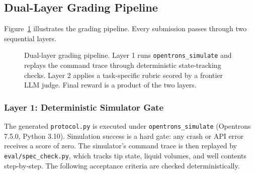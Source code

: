 \documentclass[11pt,a4paper]{article}
\begin{document}
\subsection{Dual-Layer Grading Pipeline}
\label{sec:grader}

Figure~\ref{fig:pipeline} illustrates the grading pipeline.
Every submission passes through two sequential layers.

\begin{figure}[H]
\centering
{}
\caption{Dual-layer grading pipeline. Layer 1 runs \texttt{opentrons\_simulate}
and replays the command trace through deterministic state-tracking checks.
Layer 2 applies a task-specific rubric scored by a frontier LLM judge.
Final reward is a product of the two layers.}
\label{fig:pipeline}
\end{figure}

\subsubsection{Layer 1: Deterministic Simulator Gate}
\label{sec:layer1}

The generated \texttt{protocol.py} is executed under \texttt{opentrons\_simulate}
(Opentrons 7.5.0, Python 3.10).
Simulation success is a hard gate: any crash or API error receives a score of
zero.
The simulator's command trace is then replayed by \texttt{eval/spec\_check.py},
which tracks tip state, liquid volumes, and well contents step-by-step.
The following acceptance criteria are checked deterministically.
\end{document}
